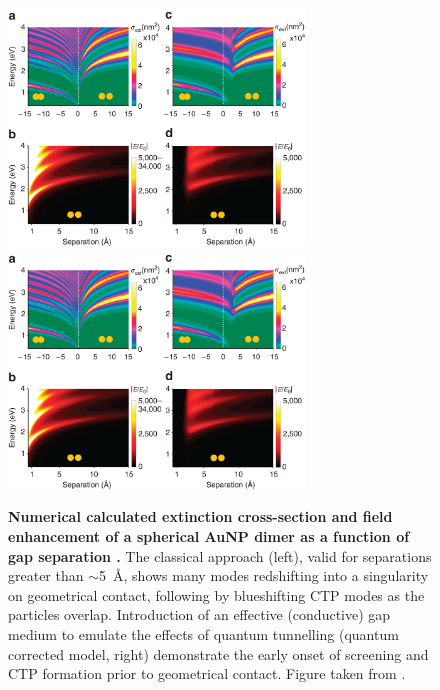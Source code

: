 \documentclass{article}
\begin{document}
\begin{figure}[bt]
\centering
\includegraphics[width=0.7\textwidth, clip=true, trim=0 412 0 45]{figures/literature/ncomms1806-f4}\\
\includegraphics[width=0.7\textwidth, clip=true, trim=0 0 0 735]{figures/literature/ncomms1806-f4}
\caption[Numerical calculated extinction cross-section and field enhancement of a spherical AuNP dimer as a function of gap separation \cite{esteban2012}]{\textbf{Numerical calculated extinction cross-section and field enhancement of a spherical AuNP dimer as a function of gap separation \cite{esteban2012}.} The classical approach (left), valid for separations greater than $\sim$\SI{5}{\angstrom}, shows many modes redshifting into a singularity on geometrical contact, following by blueshifting CTP modes as the particles overlap. Introduction of an effective (conductive) gap medium to emulate the effects of quantum tunnelling (quantum corrected model, right) demonstrate the early onset of screening and CTP formation prior to geometrical contact. Figure taken from \cite{esteban2012}.}
\label{fig:optical_response_dimer}
\end{figure}
\end{document}
